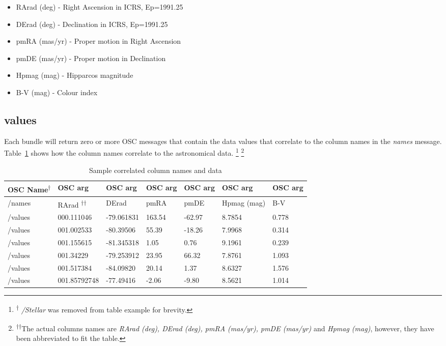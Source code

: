 \begin{itemize}
	\item RArad (deg) -  Right Ascension in ICRS, Ep=1991.25 
	\item DErad (deg) -  Declination in ICRS, Ep=1991.25
	\item pmRA (mas/yr) -  Proper motion in Right Ascension
	\item pmDE (mas/yr) - Proper motion in Declination 
	\item Hpmag (mag) - Hipparcos magnitude
	\item B-V (mag) -  Colour index
\end{itemize}

\subsection{values}
Each bundle will return zero or more OSC messages that contain the data values that correlate to the column names in the \textit{names} message. Table~\ref{tab:vizierData} shows how the column names correlate to the astronomical data. \footnote{\textsuperscript{$\dagger$} \textit{/Stellar} was removed from table example for brevity.} \footnote{\textsuperscript{$\dagger$$\dagger$}The actual columns names are \textit{RArad (deg),  DErad (deg), pmRA (mas/yr), pmDE (mas/yr)} and \textit{Hpmag (mag)}, however, they have been abbreviated to fit the table.}

\begin{table}
	\centering
	\caption{Sample correlated column names and data}
	\begin{tabular}{|l|l|l|l|l|l|l|}  \hline
		\textbf{OSC Name\textsuperscript{$\dagger$}}&\textbf{OSC arg}&\textbf{OSC arg}&\textbf{OSC arg}&\textbf{OSC arg}&\textbf{OSC arg}&\textbf{OSC arg} \\ \hline
		/names&RArad \textsuperscript{$\dagger$$\dagger$}&DErad &pmRA &pmDE &Hpmag (mag) &B-V\\ \hline
		/values&000.111046 &-79.061831 &163.54  & -62.97  &8.7854  &0.778\\ \hline
		/values&001.002533 &-80.39506  & 55.39  & -18.26  &7.9968  &0.314\\ \hline
		/values&001.155615 &-81.345318  &1.05     &0.76  &9.1961 & 0.239\\ \hline
		/values&001.34229  &-79.253912  & 23.95    &66.32  &7.8761  &1.093\\ \hline
		/values&001.517384 &-84.09820 &  20.14     &1.37  &8.6327  &1.576\\ \hline
		/values&001.85792748 &-77.49416  & -2.06    &-9.80  &8.5621  &1.014\\ \hline
		
		\hline\end{tabular}
	\label{tab:vizierData}
\end{table} 

